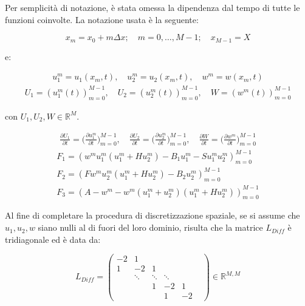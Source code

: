 \noindent Per semplicità di notazione, è stata omessa la dipendenza dal tempo di tutte le funzioni coinvolte. La notazione usata è la seguente:

\begin{equation}
    \displaystyle
    x_m = x_0 + m \Delta x; \quad m = 0,\ldots, M - 1; \quad x_{M - 1} = X
    \label{eq:notations}
\end{equation}

\noindent e:

\begin{align*}
    u_1^m = u_1(x_m, t), \quad u_2^m = u_2(x_m, t), \quad w^m = w(x_m, t)
\end{align*} %
\begin{align*}
    U_1 = (u_1^m(t))^{M - 1}_{m = 0}, \quad U_2 = (u_2^m(t))^{M - 1}_{m = 0}, \quad W = (w^m(t))^{M - 1}_{m = 0}
\end{align*} %

\noindent con $U_1, U_2, W \in \mathbb{R}^{M}$.

\begin{align*}
    \frac{\partial U_1}{\partial t} = \Big( \frac{\partial u_1^m}{\partial t} \Big)_{m = 0}^{M - 1}, \quad \frac{\partial U_2}{\partial t} = \Big( \frac{\partial u_2^m}{\partial t} \Big)_{m = 0}^{M - 1}, \quad \frac{\partial W}{\partial t} = \Big( \frac{\partial w^m}{\partial t} \Big)_{m = 0}^{M - 1}
\end{align*} %
\begin{gather*}
    F_1 = (w^mu_1^m(u_1^m+Hu_2^m)-B_1u_1^m-Su_1^mu_2^m)^{M - 1}_{m = 0} \\
    F_2 = (Fw^mu_2^m(u_1^m+Hu_2^m)-B_2u_2^m)^{M - 1}_{m = 0} \\
    F_3 = (A - w^m - w^m(u_1^m+u_2^m)(u_1^m+Hu_2^m))^{M - 1}_{m = 0}
\end{gather*} %

\noindent Al fine di completare la procedura di discretizzazione spaziale, se si assume che $u_1, u_2, w$ siano nulli al di fuori del loro dominio, risulta che la matrice $L_{Diff}$ è tridiagonale ed è data da:

\begin{equation}
    L_{Diff} = 
\begin{pmatrix}
    -2 & 1 & & & \\
    1 & -2 & 1 & \\
    & \ddots & \ddots & \ddots & & \\
    & & 1 & -2 & 1 \\
    & & & 1 & -2
 \end{pmatrix}
 \in \mathbb{R} ^ {M, M} \label{eq:matrix-Ldiff}
\end{equation}

